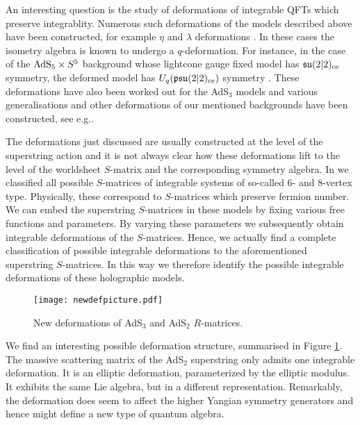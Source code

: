 \documentclass[12pt,a4paper]{article}
\numberwithin{equation}{section}
\newcommand{\su}{\mathfrak{su}}
\newcommand{\psu}{\mathfrak{psu}}
\newcommand{\adss}{{\rm AdS}}
\begin{document}
\fi

An interesting question is the study of deformations of integrable QFTs which preserve integrablity. Numerous such deformations of the models described above have been constructed, for example $\eta$ and $\lambda$ deformations \cite{Delduc:2013qra,Delduc:2014kha,Hollowood:2014qma,Arutyunov:2013ega,Sfetsos:2013wia,Sfetsos:2014cea}. In these cases the isometry algebra is known to undergo a $q$-deformation. For instance, in the case of the $\adss_5\times S^5$ background whose lightcone gauge fixed model has $\su(2|2)_{\rm ce}$ symmetry, the deformed model has $U_q(\psu(2|2)_{\rm ce})$ symmetry \cite{Beisert:2008tw,deLeeuw:2011jr}. These deformations have also been worked out for the AdS$ _3 $ models and various generalisations and other deformations of our mentioned backgrounds have been constructed, see e.g.\cite{Delduc:2014kha,Lukyanov:2012zt,Hoare:2014oua,Delduc:2018xug,Seibold:2019dvf,Bocconcello:2020qkt,Garcia:2021iox,Seibold:2021lju}.

The deformations just discussed are usually constructed at the level of the superstring action and it is not always clear how these deformations lift to the level of the worldsheet $S$-matrix and the corresponding symmetry algebra. In \cite{deLeeuw:2020ahe} we classified all possible $S$-matrices of integrable systems of so-called $6$- and $8$-vertex type. Physically, these correspond to $S$-matrices which preserve fermion number. We can embed the superstring $S$-matrices in these models by fixing various free functions and parameters. By varying these parameters we subsequently obtain integrable deformations of the $S$-matrices. Hence, we actually find a complete classification of possible integrable deformations to the aforementioned superstring $S$-matrices. In this way we therefore identify the possible integrable deformations of these holographic models. 

\begin{figure}[h]
	\hspace{3cm}	\texttt{[image: newdefpicture.pdf]}
	\caption{New deformations of AdS$ _3 $ and AdS$ _2 $ $ R $-matrices.}
	\label{deformationsdiagram}
\end{figure}

We find an interesting possible deformation structure, summarised in Figure \ref{deformationsdiagram}. The massive scattering matrix of the AdS$_2$ superstring only admits one integrable deformation. It is an elliptic deformation, parameterized by the elliptic modulus. It exhibits the same Lie algebra, but in a different representation. Remarkably, the deformation does seem to affect the higher Yangian symmetry generators and hence might define a new type of quantum algebra.
\end{document}
